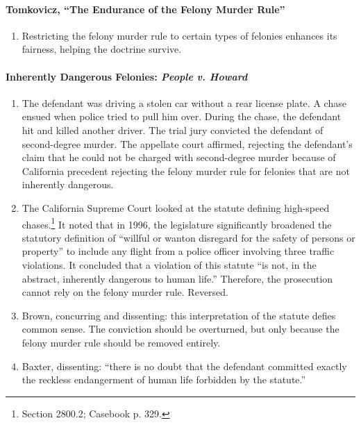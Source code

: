 \paragraph{Tomkovicz, ``The Endurance of the Felony Murder Rule''}

\begin{enumerate}
    \item Restricting the felony murder rule to certain types of felonies enhances its fairness, helping the doctrine survive.
\end{enumerate}

\paragraph{Inherently Dangerous Felonies: \emph{People v. Howard}}

\begin{enumerate}
    \item The defendant was driving a stolen car without a rear license plate. A chase ensued when police tried to pull him over. During the chase, the defendant hit and killed another driver. The trial jury convicted the defendant of second-degree murder. The appellate court affirmed, rejecting the defendant's claim that he could not be charged with second-degree murder because of California precedent rejecting the felony murder rule for felonies that are not inherently dangerous. %
    \item The California Supreme Court looked at the statute defining high-speed chases.\footnote{Section 2800.2; Casebook p. 329.} It noted that in 1996, the legislature significantly broadened the statutory definition of ``willful or wanton disregard for the safety of persons or property'' to include any flight from a police officer involving three traffic violations. It concluded that a violation of this statute ``is not, in the abstract, inherently dangerous to human life.'' Therefore, the prosecution cannot rely on the felony murder rule. Reversed.
    \item Brown, concurring and dissenting: this interpretation of the statute defies common sense. The conviction should be overturned, but only because the felony murder rule should be removed entirely.
    \item Baxter, dissenting: ``there is no doubt that the defendant committed exactly the reckless endangerment of human life forbidden by the statute.''
\end{enumerate}

